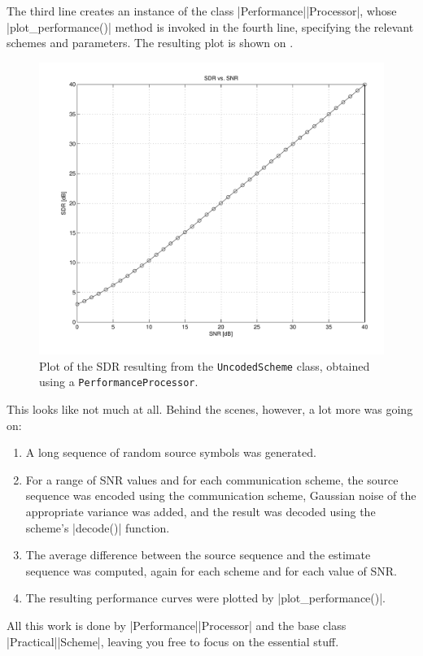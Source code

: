 The third line creates an instance of the class |Performance|\-|Processor|, whose
|plot_performance()| method is invoked in the fourth line, specifying the
relevant schemes and parameters. The resulting plot is shown on
.

\begin{figure}
  \begin{center}
    \includegraphics[width=\textwidth]{figures/matlab/ex_uncoded.pdf}
  \end{center}
  \caption{Plot of the SDR resulting from the \texttt{UncodedScheme} class,
  obtained using a \texttt{PerformanceProcessor}.}
  \label{fig:uncoded}
\end{figure}

This looks like not much at all. Behind the scenes, however, a lot more was
going on:
\begin{enumerate}
  \item A long sequence of random source symbols was generated.
  \item For a range of SNR values and for each communication scheme, the source
    sequence was encoded using the communication scheme, Gaussian noise of the
    appropriate variance was added, and the result was decoded using the
    scheme's |decode()| function.
  \item The average difference between the source sequence and the estimate
    sequence was computed, again for each scheme and for each value of SNR. 
  \item The resulting performance curves were plotted by |plot_performance()|.
\end{enumerate}
All this work is done by |Performance|\-|Processor| and the base class
|Practical|\-|Scheme|, leaving you free to focus on the essential stuff.


